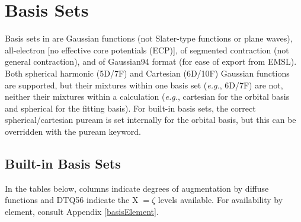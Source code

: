 \section{Basis Sets}

Basis sets in \PSIfour are Gaussian functions (not Slater-type functions or plane waves), all-electron [no effective core potentials (ECP)], of segmented contraction (not general contraction), and of Gaussian94 format (for ease of export from EMSL). Both spherical harmonic (5D/7F) and Cartesian (6D/10F) Gaussian functions are supported, but their mixtures within one basis set (\textit{e.g.}, 6D/7F) are not, neither their mixtures within a calculation (\textit{e.g.}, cartesian for the orbital basis and spherical for the fitting basis). For built-in basis sets, the correct spherical/cartesian puream is set internally for the orbital basis, but this can be overridden with the puream keyword. 


\subsection{Built-in Basis Sets}
In the tables below, columns indicate degrees of augmentation by diffuse functions and DTQ56 indicate the X$\;=\zeta$ levels available. For availability by element, consult Appendix \ref{basisElement}.

